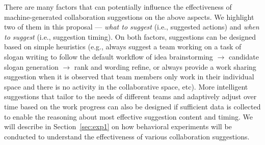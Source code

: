 There are many factors that can potentially influence the effectiveness of machine-generated collaboration suggestions on the above aspects. We highlight two of them in this proposal --- {\em what to suggest} (i.e., suggested actions) and {\em when to suggest} (i.e., suggestion timing). On both factors, suggestions can be designed based on simple heuristics (e.g., always suggest a team working on a task of slogan writing to follow the default workflow of idea brainstorming $\rightarrow$ candidate slogan generation $\rightarrow$ rank and wording refine, or always provide a work sharing suggestion when it is observed that team members only work in their individual space and there is no activity in the collaborative space, etc). More intelligent suggestions that tailor to the needs of different teams and adaptively adjust over time based on the work progress can also be designed if sufficient data is collected to enable the reasoning about most effective suggestion content and timing. We will describe in Section~\ref{sec:exp1} on how behavioral experiments will be conducted to understand the effectiveness of various collaboration suggestions.





